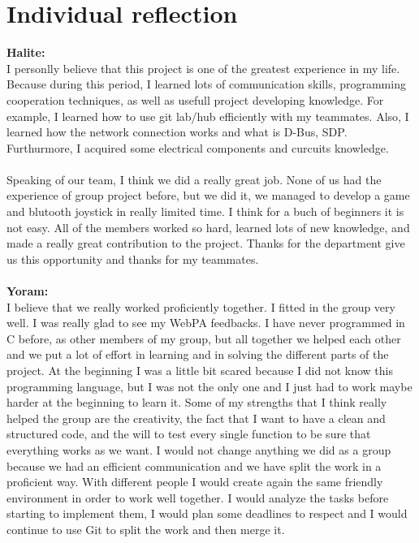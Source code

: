 \documentclass[a4paper]{article}
\begin{document}
\section{Individual reflection}
\textbf{Halite:}\\
I personlly believe that this project is one of the greatest experience in my life. Because during this period, I learned lots of communication skills, programming cooperation techniques, as well as usefull project developing knowledge. For example, I learned how to use git lab/hub efficiently with my teammates. Also, I learned how the network connection works and what is D-Bus, SDP. Furthurmore, I acquired some electrical components and curcuits knowledge.\\\\
Speaking of our team, I think we did a really great job. None of us had the experience of group project before, but we did it, we managed to develop a game and blutooth joystick in really limited time. I think for a buch of beginners it is not easy. All of the members worked so hard, learned lots of new knowledge, and made a really great contribution to the project. Thanks for the department give us this opportunity and thanks for my teammates.
\\
\\
\textbf{Yoram:}\\
I believe that we really worked proficiently together. I fitted in the group very well. I was really glad to see my WebPA feedbacks. I have never programmed in C before, as other members of my group, but all together we helped each other and we put a lot of effort in learning and in solving the different parts of the project. At the beginning I was a little bit scared because I did not know this programming language, but I was not the only one and I just had to work maybe harder at the beginning to learn it. Some of my strengths that I think really helped the group are the creativity, the fact that I want to have a clean and structured code, and the will to test every single function to be sure that everything works as we want.
I would not change anything we did as a group because we had an efficient communication and we have split the work in a proficient way. With different people I would create again the same friendly environment in order to work well together. I would analyze the tasks before starting to implement them, I would plan some deadlines to respect and I would continue to use Git to split the work and then merge it. 
\\\\
\end{document}
